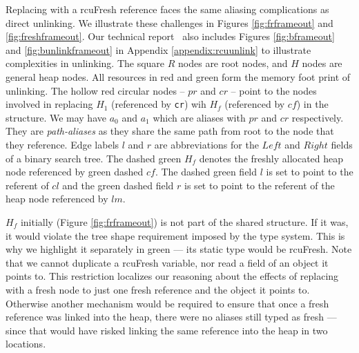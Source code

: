 Replacing with a \textsf{rcuFresh} reference faces the same aliasing complications as direct unlinking.
We illustrate these challenges in Figures \ref{fig:frframeout} and \ref{fig:freshframeout}. Our technical report~\cite{isotek} also includes Figures \ref{fig:bframeout} and \ref{fig:bunlinkframeout} in Appendix \ref{appendix:rcuunlink} to illustrate complexities in unlinking.
The square $R$ nodes are root nodes, and $H$ nodes are general heap nodes.
All resources in red and green form the memory foot print of unlinking. The hollow red circular nodes -- $pr$ and $cr$ -- point to the nodes involved in replacing $H_1$ (referenced by \texttt{cr}) wih $H_f$ (referenced by $cf$) in the structure.
We may have $a_0$ and $a_1$ which are aliases with $pr$ and $cr$ respectively. They are \textit{path-aliases} as they share the same path from root to the node that they reference. 
Edge labels $l$ and $r$ are abbreviations for the $Left$ and $Right$ fields of a binary search tree.
The dashed green $H_f$ denotes the freshly allocated heap node referenced by green dashed  $cf$. The dashed green field $l$ is set to point to the referent of $cl$ and the green dashed field $r$ is set to point to the referent of the heap node referenced by $lm$.

$H_f$ initially (Figure \ref{fig:frframeout}) is not part of the shared structure.  If it was, it would violate the tree shape requirement imposed by the type system.  This is why we highlight it separately in green --- its static type would be \textsf{rcuFresh}.
Note that we cannot duplicate a \textsf{rcuFresh} variable, nor read a field of an object it points to.
This restriction localizes our reasoning about the effects of replacing with a fresh node to just one fresh reference and the object it points to.
Otherwise another mechanism would be required to ensure that once a fresh reference was linked into the heap, there were no aliases still typed as fresh --- since that would have risked linking the same reference into the heap in two locations.

